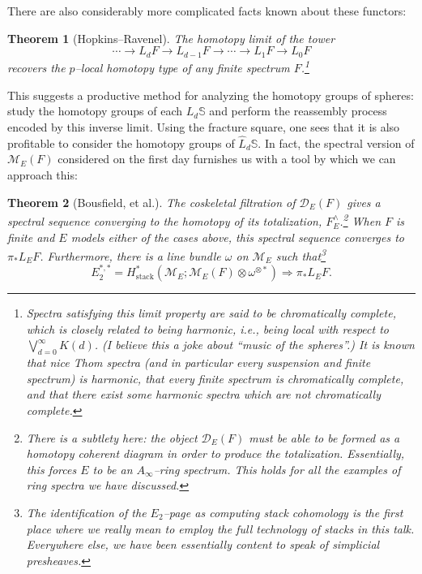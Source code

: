 \documentclass{amsart}
\renewcommand{\S}{\mathbb S}
\newcommand{\M}{\mathcal{M}}
\newcommand{\<}{\langle}
\renewcommand{\>}{\rangle}
\theoremstyle{plain}
\newtheorem*{theorem}{Theorem}
\theoremstyle{definition}
\theoremstyle{remark}
\begin{document}
There are also considerably more complicated facts known about these functors:
\begin{theorem}[Hopkins--Ravenel]
The homotopy limit of the tower \[\cdots \to L_d F \to L_{d-1} F \to \cdots \to L_1 F \to L_0 F\] recovers the $p$--local homotopy type of any finite spectrum $F$.\footnote{Spectra satisfying this limit property are said to be \textit{chromatically complete}, which is closely related to being \textit{harmonic}, i.e., being local with respect to $\bigvee_{d=0}^\infty K(d)$.  (I believe this a joke about ``music of the spheres''.)  It is known that nice Thom spectra (and in particular every suspension and finite spectrum) is harmonic, that every finite spectrum is chromatically complete, and that there exist some harmonic spectra which are not chromatically complete.}
\end{theorem}

\noindent This suggests a productive method for analyzing the homotopy groups of spheres: study the homotopy groups of each $L_d \S$ and perform the reassembly process encoded by this inverse limit.  Using the fracture square, one sees that it is also profitable to consider the homotopy groups of $\widehat L_d \S$.  In fact, the spectral version of $\M_E(F)$ considered on the first day furnishes us with a tool by which we can approach this:

\begin{theorem}[Bousfield, et al.]
The coskeletal filtration of $\mathcal D_E(F)$ gives a spectral sequence converging to the homotopy of its totalization, $F^\wedge_E$.\footnote{There is a subtlety here: the object $\mathcal D_E(F)$ must be able to be formed as a homotopy coherent diagram in order to produce the totalization. Essentially, this forces $E$ to be an $A_\infty$--ring spectrum. This holds for all the examples of ring spectra we have discussed.}  When $F$ is finite and $E$ models either of the cases above, this spectral sequence converges to $\pi_* L_E F$.  Furthermore, there is a line bundle $\omega$ on $\M_E$ such that\footnote{The identification of the $E_2$--page as computing stack cohomology is the first place where we really mean to employ the full technology of stacks in this talk.  Everywhere else, we have been essentially content to speak of simplicial presheaves.} \[E_2^{*, *} = H^*_{\mathrm{stack}}(\M_E; \M_E(F) \otimes \omega^{\otimes *}) \Rightarrow \pi_* L_E F.\]
\end{theorem}
\end{document}
